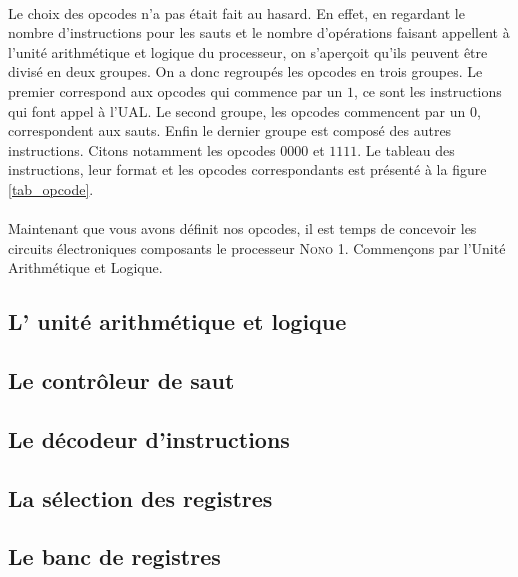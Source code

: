 \documentclass[a4paper]{article}
\begin{document}
			\paragraph{}{
			Le choix des opcodes n'a pas était fait au hasard. En effet, en regardant le nombre
			d'instructions pour les sauts et le nombre d'opérations faisant appellent à l'unité
			arithmétique et logique du processeur, on s’aperçoit qu'ils peuvent être divisé 
			en deux 	groupes. On a donc regroupés les opcodes en trois groupes. Le premier 
			correspond aux opcodes qui commence par un $1$, ce sont les instructions qui font 
			appel à l'UAL. Le second groupe, les opcodes commencent par un $0$, correspondent 
			aux sauts. Enfin le dernier groupe est composé des autres instructions. Citons
			notamment les opcodes $0000$ et $1111$. Le tableau des instructions, leur format et
			les opcodes correspondants est présenté à la figure \ref{tab_opcode}.
			}
			
			\paragraph{}{
			Maintenant que vous avons définit nos opcodes, il est temps de concevoir les circuits
			électroniques composants le processeur \textsc{Nono 1}. Commençons par l'Unité 
			Arithmétique et Logique.
			}
	
		\subsection{L' unité arithmétique et logique}
			
			
		\subsection{Le contrôleur de saut}
			
			
		\subsection{Le décodeur d'instructions}
			
			
		\subsection{La sélection des registres}
			
			
		\subsection{Le banc de registres}
			
	
\end{document}
